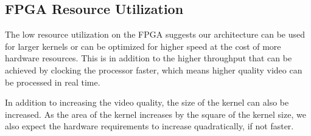 \subsection{FPGA Resource Utilization}
The low resource utilization on the FPGA suggests our architecture can be used for larger kernels or can be optimized for higher speed at the cost of more hardware resources.
This is in addition to the higher throughput that can be achieved by clocking the processor faster, which means higher quality video can be processed in real time.

In addition to increasing the video quality, the size of the kernel can also be increased.
As the area of the kernel increases by the square of the kernel size, we also expect the hardware requirements to increase quadratically, if not faster.
